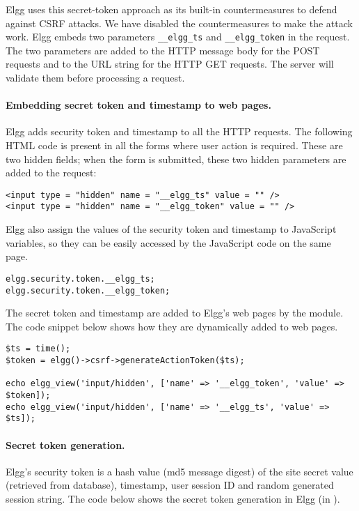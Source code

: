 Elgg uses this secret-token approach as its 
built-in countermeasures to defend against CSRF attacks. 
We have disabled the countermeasures to make the attack work. 
Elgg embeds two parameters
{\tt\_\_elgg\_ts} and {\tt\_\_elgg\_token} in the request.
The two parameters are added to the HTTP message body for the POST requests and to the URL
string for the HTTP GET requests. The server will validate them
before processing a request. 


\paragraph{Embedding secret token and timestamp to web pages.}
Elgg adds security token and timestamp to all the HTTP requests. 
The following HTML code is present in all the forms where user action is required. 
These are two hidden fields; when the form is submitted, these
two hidden parameters are added to the request:

\begin{lstlisting}
<input type = "hidden" name = "__elgg_ts" value = "" />
<input type = "hidden" name = "__elgg_token" value = "" />
\end{lstlisting}

Elgg also assign the values of the security token and timestamp to JavaScript variables, 
so they can be easily accessed by the JavaScript code on the same page.

\begin{lstlisting}
elgg.security.token.__elgg_ts;
elgg.security.token.__elgg_token;
\end{lstlisting}


The secret token and timestamp are added to Elgg's web pages by the 
module. The code snippet below shows how they are dynamically 
added to web pages.

\begin{lstlisting}
$ts = time();
$token = elgg()->csrf->generateActionToken($ts);

echo elgg_view('input/hidden', ['name' => '__elgg_token', 'value' => $token]);
echo elgg_view('input/hidden', ['name' => '__elgg_ts', 'value' => $ts]);
\end{lstlisting}


\paragraph{Secret token generation.}
Elgg's security token is a hash value (md5 message digest) of the site 
secret value (retrieved from database),
timestamp, user session ID and random generated session string. 
The code below shows the secret token generation in Elgg 
(in ).

